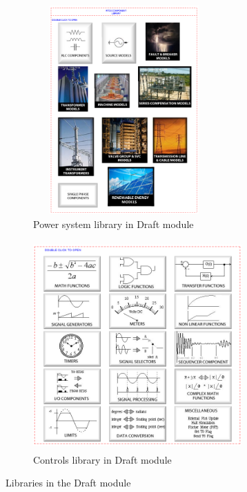 \begin{figure}[H]
\centering
\begin{subfigure}{.5\textwidth}
  \centering
  \includegraphics[height=8cm,width=7cm]{Diagrams/Chapter_3/Power_system_lib.PNG}
  \caption{Power system library in Draft module}
  \label{fig:Power_system_lib}
\end{subfigure}%
\begin{subfigure}{.5\textwidth}
  \centering
  \includegraphics[height=8cm,width=8cm]{Diagrams/Chapter_3/Control_system_lib.PNG}
  \caption{Controls library in Draft module}
  \label{fig:Controls_lib}
\end{subfigure}
\caption{Libraries in the Draft module}
\end{figure}

